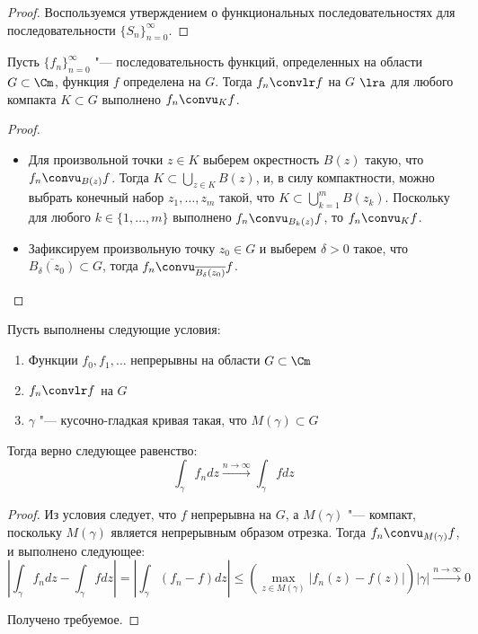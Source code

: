 \begin{proof}
	Воспользуемся утверждением о функциональных последовательностях для последовательности $\{S_n\}_{n=0}^\infty$.
\end{proof}

\begin{proposition}
	Пусть $\{f_n\}_{n = 0}^\infty$ "--- последовательность функций, определенных на области $G \subset \Cm$, функция $f$ определена на $G$. Тогда $f_n \convlr f$ на $G$ $\lra$ для любого компакта $K \subset G$ выполнено $f_n \convu_K f$.
\end{proposition}

\begin{proof}~
	\begin{itemize}
		\item[$\ra$]Для произвольной точки $z \in K$ выберем окрестность $B(z)$ такую, что $f_n \convu_{B(z)} f$. Тогда $K \subset \bigcup_{z \in K}B(z)$, и, в силу компактности, можно выбрать конечный набор $z_1, \dotsc, z_m$ такой, что $K \subset \bigcup_{k=1}^mB(z_k)$. Поскольку для любого $k \in \{1, \dotsc, m\}$ выполнено $f_n \convu_{B_k(z)} f$, то $f_n \convu_K f$.
		
		\item[$\la$]Зафиксируем произвольную точку $z_0 \in G$ и выберем $\delta > 0$ такое, что $\overline{B_\delta(z_0)} \subset G$, тогда $f_n \convu_{\overline{B_\delta(z_0)}} f$.\qedhere
	\end{itemize}
\end{proof}

\begin{proposition}
	Пусть выполнены следующие условия:
	\begin{enumerate}
		\item Функции $f_0, f_1, \dotsc$ непрерывны на области $G \subset \Cm$
		\item $f_n \convlr f$ на $G$
		\item $\gamma$ "--- кусочно-гладкая кривая такая, что $M(\gamma) \subset G$
	\end{enumerate}
	
	Тогда верно следующее равенство:
	\[\int_\gamma f_ndz \xrightarrow{n \to \infty} \int_\gamma fdz\]
\end{proposition}

\begin{proof}
	Из условия следует, что $f$ непрерывна на $G$, а $M(\gamma)$ "--- компакт, поскольку $M(\gamma)$ является непрерывным образом отрезка. Тогда $f_n \convu_{M(\gamma)} f$, и выполнено следующее:
	\[\left|\int_\gamma f_ndz - \int_\gamma fdz\right| = \left|\int_\gamma (f_n - f)dz\right| \le \left(\max_{z \in M(\gamma)}|f_n(z) - f(z)|\right)|\gamma| \xrightarrow{n \to \infty} 0\]
	
	Получено требуемое.
\end{proof}

